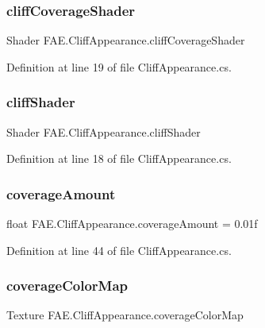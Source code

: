 \subsubsection{cliff\+Coverage\+Shader}
{\footnotesize\ttfamily Shader F\+A\+E.\+Cliff\+Appearance.\+cliff\+Coverage\+Shader}



Definition at line 19 of file Cliff\+Appearance.\+cs.

\mbox{\label{class_f_a_e_1_1_cliff_appearance_aca5056b3470ec765564034bb08ee53b7}} 
\subsubsection{cliff\+Shader}
{\footnotesize\ttfamily Shader F\+A\+E.\+Cliff\+Appearance.\+cliff\+Shader}



Definition at line 18 of file Cliff\+Appearance.\+cs.

\mbox{\label{class_f_a_e_1_1_cliff_appearance_a061308225ab5f46a0a5a969949fe506a}} 
\subsubsection{coverage\+Amount}
{\footnotesize\ttfamily float F\+A\+E.\+Cliff\+Appearance.\+coverage\+Amount = 0.\+01f}



Definition at line 44 of file Cliff\+Appearance.\+cs.

\mbox{\label{class_f_a_e_1_1_cliff_appearance_a18620288fd4d766e3d3d2fa468303cb3}} 
\subsubsection{coverage\+Color\+Map}
{\footnotesize\ttfamily Texture F\+A\+E.\+Cliff\+Appearance.\+coverage\+Color\+Map}



